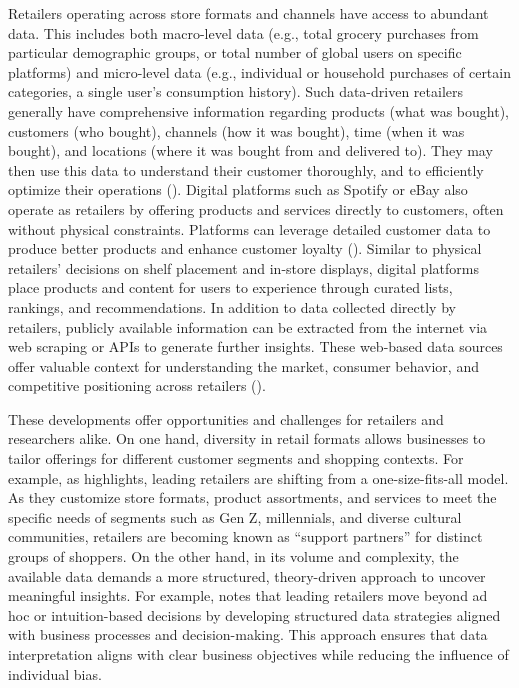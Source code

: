 Retailers operating across store formats and channels have access to abundant data. This includes both macro-level data (e.g., total grocery purchases from particular demographic groups, or total number of global users on specific platforms) and micro-level data (e.g., individual or household purchases of certain categories, a single user’s consumption history). Such data-driven retailers generally have comprehensive information regarding products (what was bought), customers (who bought), channels (how it was bought), time (when it was bought), and locations (where it was bought from and delivered to). They may then use this data to understand their customer thoroughly, and to efficiently optimize their operations (\cite{Bradlow2017-qf,Van_Heerde2024-am}). Digital platforms such as Spotify or eBay also operate as retailers by offering products and services directly to customers, often without physical constraints. Platforms can leverage detailed customer data to produce better products and enhance customer loyalty (\cite{Smith2016-sp}). Similar to physical retailers’ decisions on shelf placement and in-store displays, digital platforms place products and content for users to experience through curated lists, rankings, and recommendations. In addition to data collected directly by retailers, publicly available information can be extracted from the internet via web scraping or APIs to generate further insights. These web-based data sources offer valuable context for understanding the market, consumer behavior, and competitive positioning across retailers (\cite{Bonfrer2022-tb,Guyt2024-nq}).

These developments offer opportunities and challenges for retailers and researchers alike. On one hand, diversity in retail formats allows businesses to tailor offerings for different customer segments and shopping contexts. For example, as \textcite{Forbes2024-nt} highlights, leading retailers are shifting from a one-size-fits-all model. As they customize store formats, product assortments, and services to meet the specific needs of segments such as Gen Z, millennials, and diverse cultural communities, retailers are becoming known as “support partners” for distinct groups of shoppers. On the other hand, in its volume and complexity, the available data demands a more structured, theory-driven approach to uncover meaningful insights. For example, \textcite{KPMG2025-ye} notes that leading retailers move beyond ad hoc or intuition-based decisions by developing structured data strategies aligned with business processes and decision-making. This approach ensures that data interpretation aligns with clear business objectives while reducing the influence of individual bias.

